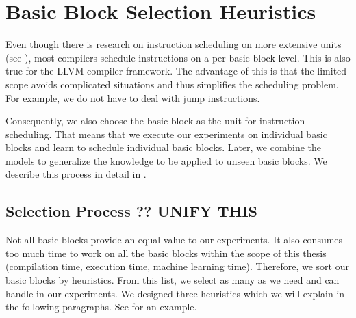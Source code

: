 \section{Basic Block Selection Heuristics}
\label{sec:approach:basicblock}
Even though there is research on instruction scheduling on more extensive units (see ), most compilers schedule instructions on a per basic block level.
This is also true for the LLVM compiler framework.
The advantage of this is that the limited scope avoids complicated situations and thus simplifies the scheduling problem.
For example, we do not have to deal with jump instructions.

Consequently, we also choose the basic block as the unit for instruction scheduling.
That means that we execute our experiments on individual basic blocks and learn to schedule individual basic blocks.
Later, we combine the models to generalize the knowledge to be applied to unseen basic blocks.
We describe this process in detail in .

\subsection{Selection Process ?? UNIFY THIS}
\label{sec:approach:basicblock:selection}
Not all basic blocks provide an equal value to our experiments.
It also consumes too much time to work on all the basic blocks within the scope of this thesis (\eg compilation time, execution time, machine learning time).
Therefore, we sort our basic blocks by heuristics. 
From this list, we select as many as we need and can handle in our experiments.
We designed three heuristics which we will explain in the following paragraphs.
See  for an example.

